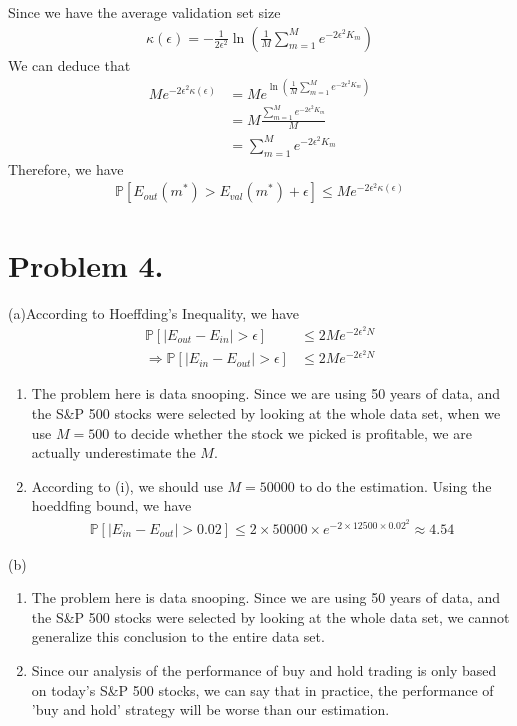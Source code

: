 \documentclass{article}
\begin{document}
    Since we have the average validation set size
    \begin{align*}
        \kappa(\epsilon) = 
        -\frac{1}{2 \epsilon^2} \ln(\frac{1}{M} \sum_{m=1}^{M} e^{-2 \epsilon^2 K_m})
    \end{align*}
    We can deduce that 
    \begin{align*}
        M e^{-2 \epsilon^2 \kappa(\epsilon)} & = M e^{\ln(\frac{1}{M} \sum_{m=1}^{M} e^{-2 \epsilon^2 K_m})}\\
        & = M \frac{\sum_{m=1}^{M} e^{-2 \epsilon^2 K_m}}{M}\\
        & = \sum_{m=1}^{M} e^{-2 \epsilon^2 K_m}
    \end{align*}
    Therefore, we have 
    \begin{align*}
        \mathbb{P}[E_{out}(m^*) > E_{val}(m^*) + \epsilon] \leq M e^{-2 \epsilon^2 \kappa(\epsilon)}
    \end{align*}

    \section*{Problem 4.}
    (a)According to Hoeffding's Inequality, we have 
    \begin{align*}
        \mathbb{P}[|E_{out} - E_{in}| > \epsilon] & \leq 2M e^{-2 \epsilon^2 N}\\
        \Rightarrow \mathbb{P}[|E_{in} - E_{out}| > \epsilon] & \leq 2M e^{-2 \epsilon^2 N}
    \end{align*}
    \begin{enumerate}[i]
        \item The problem here is data snooping. Since we are using 50 years of data, and the S\&P 500 stocks were 
        selected by looking at the whole data set, when we use $M = 500$ to decide whether the stock we picked is 
        profitable, we are actually underestimate the $M$.
        \item According to (i), we should use $M = 50000$ to do the estimation. Using the hoeddfing bound, we have
        \begin{align*}
            \mathbb{P}[|E_{in} - E_{out}| > 0.02] \leq 2 \times 50000 \times e^{-2 \times 12500 \times 0.02^2}
            \approx 4.54
        \end{align*}
    \end{enumerate}
    (b)
    \begin{enumerate}[i]
        \item The problem here is data snooping. Since we are using 50 years of data, and the S\&P 500 stocks were 
        selected by looking at the whole data set, we cannot generalize this conclusion to the entire data set.
        \item Since our analysis of the performance of buy and hold trading is only based on today's S\&P 500 stocks,
        we can say that in practice, the performance of 'buy and hold' strategy will be worse than our estimation.
    \end{enumerate}
\end{document}
